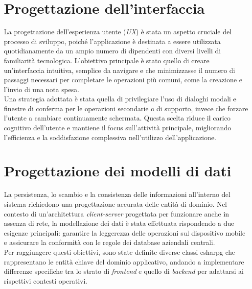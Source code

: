 \section{Progettazione dell'interfaccia}
\noindent La progettazione dell'esperienza utente (\textit{UX}) è stata un aspetto cruciale del processo di sviluppo, poiché l'applicazione è destinata a essere utilizzata quotidianamente da un ampio numero di dipendenti con diversi livelli di familiarità tecnologica. L'obiettivo principale è stato quello di creare un'interfaccia intuitiva, semplice da navigare e che minimizzasse il numero di passaggi necessari per completare le operazioni più comuni, come la creazione e l'invio di una nota spesa. \\
Una strategia adottata è stata quella di privilegiare l'uso di dialoghi modali e finestre di conferma per le operazioni secondarie o di supporto, invece che forzare l'utente a cambiare continuamente schermata. Questa scelta riduce il carico cognitivo dell'utente e mantiene il focus sull'attività principale, migliorando l'efficienza e la soddisfazione complessiva nell'utilizzo dell'applicazione.


\section{Progettazione dei modelli di dati}
\noindent La persistenza, lo scambio e la consistenza delle informazioni all'interno del sistema richiedono una progettazione accurata delle entità di dominio. Nel contesto di un'architettura \textit{client-server} progettata per funzionare anche in assenza di rete, la modellazione dei dati è stata effettuata rispondendo a due esigenze principali: garantire la leggerezza delle operazioni sul dispositivo mobile e assicurare la conformità con le regole dei database aziendali centrali. \\
Per raggiungere questi obiettivi, sono state definite diverse classi \gls{csharpg} che rappresentano le entità chiave del dominio applicativo, andando a implementare differenze specifiche tra lo strato di \textit{frontend} e quello di \textit{backend} per adattarsi ai rispettivi contesti operativi. 

